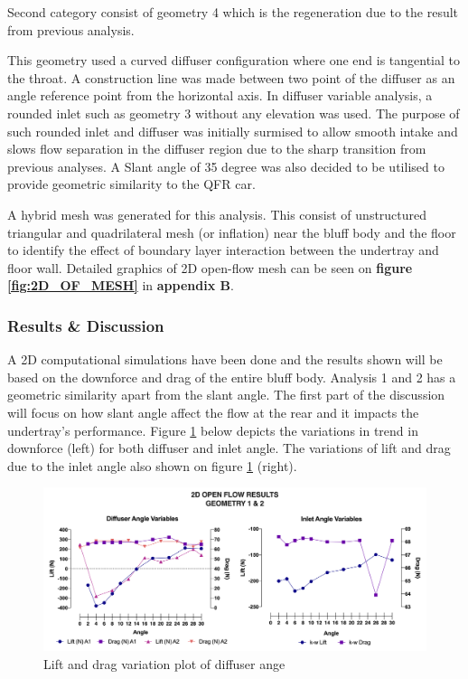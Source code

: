 \noindent Second category consist of geometry 4 which is the regeneration due to the result from previous analysis.

This geometry used a curved diffuser configuration where one end is tangential to the throat. A construction line was made between two point of the diffuser as an angle reference point from the horizontal axis. In diffuser variable analysis, a rounded inlet such as geometry 3 without any elevation was used. The purpose of such rounded inlet and diffuser was initially surmised to allow smooth intake and slows flow separation in the diffuser region due to the sharp transition from previous analyses. A Slant angle of 35 degree was also decided to be utilised to provide geometric similarity to the QFR car.

\noindent A hybrid mesh was generated for this analysis. This consist of unstructured triangular and quadrilateral mesh (or inflation) near the bluff body and the floor to identify the effect of boundary layer interaction between the undertray and floor wall.  Detailed graphics of 2D open-flow mesh can be seen on \textbf{figure \ref{fig:2D_OF_MESH}} in \textbf{appendix B}.



\subsubsection{Results \& Discussion}

\noindent A 2D computational simulations have been done and the results shown will be based on the downforce and drag of the entire bluff body. Analysis 1 and 2 has a geometric similarity apart from the slant angle. The first part of the discussion will focus on how slant angle affect the flow at the rear and it impacts the undertray's performance. Figure \ref{fig:2D_OF_A12_results} below depicts the variations in trend in downforce (left) for both diffuser and inlet angle. The variations of lift and drag due to the inlet angle also shown on figure \ref{fig:2D_OF_A12_results} (right).

\begin{figure}[!ht]
    \centering
    \includegraphics[scale = 0.65]{Figures/Graph/2D_OF_A1-2.png}
    \caption{Lift and drag variation plot of diffuser ange }
    \label{fig:2D_OF_A12_results}
\end{figure}








